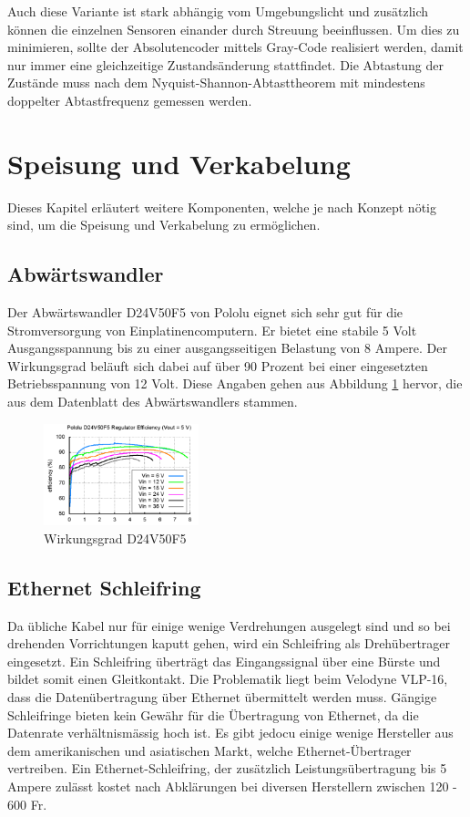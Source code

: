 Auch diese Variante ist stark abhängig vom Umgebungslicht und zusätzlich können die einzelnen Sensoren einander durch Streuung beeinflussen. Um dies zu minimieren, sollte der Absolutencoder mittels Gray-Code realisiert werden, damit nur immer eine gleichzeitige Zustandsänderung stattfindet. Die Abtastung der Zustände muss nach dem Nyquist-Shannon-Abtasttheorem mit mindestens doppelter Abtastfrequenz gemessen werden.
 
\section{Speisung und Verkabelung}
\label{sec:Speisung und Verkabelung}
Dieses Kapitel erläutert weitere Komponenten, welche je nach Konzept nötig sind, um  die Speisung und Verkabelung zu ermöglichen.

\subsection{Abwärtswandler}
\label{subsec:Abwaertswandler}
Der Abwärtswandler D24V50F5 von Pololu eignet sich sehr gut für die Stromversorgung von Einplatinencomputern. Er bietet eine stabile 5 Volt Ausgangsspannung bis zu einer ausgangsseitigen Belastung von 8 Ampere. Der Wirkungsgrad beläuft sich dabei auf über 90 Prozent bei einer eingesetzten Betriebsspannung von 12 Volt. Diese Angaben gehen aus Abbildung \ref{fig:D24V50F5} hervor, die aus dem Datenblatt des Abwärtswandlers stammen.\cite{D24V50F5}
\begin{figure}[H]
	\centering
	\includegraphics[width=0.4\textwidth]
	{resources/D24V50F5.PNG}
	\caption[Wirkungsgrad D24V50F5]{Wirkungsgrad D24V50F5 \protect\cite{D24V50F5}}
	\label{fig:D24V50F5}
\end{figure}

\subsection{Ethernet Schleifring}
\label{subsec:Schleifring}
Da übliche Kabel nur für einige wenige Verdrehungen ausgelegt sind und so bei drehenden Vorrichtungen kaputt gehen, wird ein Schleifring als Drehübertrager eingesetzt. Ein Schleifring überträgt das Eingangssignal über eine Bürste und bildet somit einen Gleitkontakt. Die Problematik liegt beim Velodyne VLP-16, dass die Datenübertragung über Ethernet übermittelt werden muss. Gängige Schleifringe bieten kein Gewähr für die Übertragung von Ethernet, da die Datenrate verhältnismässig hoch ist. Es gibt jedocu einige wenige Hersteller aus dem amerikanischen und asiatischen Markt, welche Ethernet-Übertrager vertreiben. Ein Ethernet-Schleifring, der zusätzlich Leistungsübertragung bis 5 Ampere zulässt kostet nach Abklärungen bei diversen Herstellern zwischen 120 - 600 Fr.  

